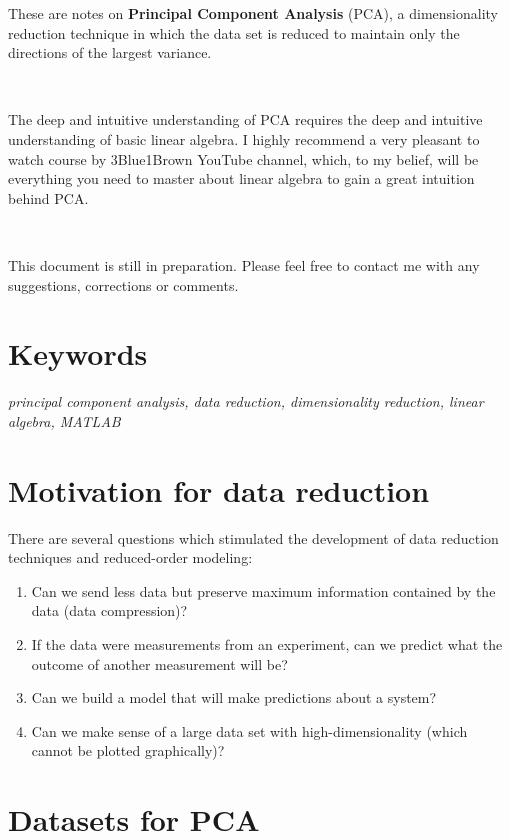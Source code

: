 \documentclass[10pt,twocolumn]{article}
\begin{document}
These are notes on \textbf{Principal Component Analysis} (PCA), a dimensionality reduction technique in which the data set is reduced to maintain only the directions of the largest variance.

\,\,

The deep and intuitive understanding of PCA requires the deep and intuitive understanding of basic linear algebra. I highly recommend a very pleasant to watch course by 3Blue1Brown YouTube channel, which, to my belief, will be everything you need to master about linear algebra to gain a great intuition behind PCA.

\,\,

This document is still in preparation. Please feel free to contact me with any suggestions, corrections or comments.

\section*{Keywords}

\textit{principal component analysis, data reduction, dimensionality reduction, linear algebra, MATLAB\textregistered}

\tableofcontents

\section{Motivation for data reduction}

There are several questions which stimulated the development of data reduction techniques and reduced-order modeling:

\begin{enumerate}
\item Can we send less data but preserve maximum information contained by the data (data compression)?

\item If the data were measurements from an experiment, can we predict what the outcome of another measurement will be?

\item Can we build a model that will make predictions about a system?

\item Can we make sense of a large data set with high-dimensionality (which cannot be plotted graphically)?
\end{enumerate}

\section{Datasets for PCA}
\end{document}
